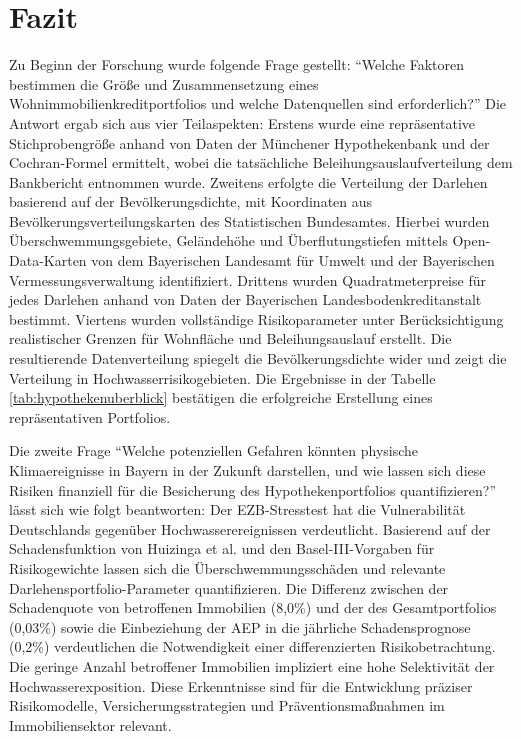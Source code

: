 \section{Fazit}
Zu Beginn der Forschung wurde folgende Frage gestellt: \enquote{Welche Faktoren bestimmen die Größe und Zusammensetzung eines Wohnimmobilienkreditportfolios und welche Datenquellen sind erforderlich?}  Die Antwort ergab sich aus vier Teilaspekten: Erstens wurde eine repräsentative Stichprobengröße anhand von Daten der Münchener Hypothekenbank und der Cochran-Formel ermittelt, wobei die tatsächliche Beleihungsauslaufverteilung dem Bankbericht entnommen wurde. Zweitens erfolgte die Verteilung der Darlehen basierend auf der Bevölkerungsdichte, mit Koordinaten aus Bevölkerungsverteilungskarten des Statistischen Bundesamtes. Hierbei wurden Überschwemmungsgebiete, Geländehöhe und Überflutungstiefen mittels Open-Data-Karten von \textcite{suche_postleitzahl} dem Bayerischen Landesamt für Umwelt und der Bayerischen Vermessungsverwaltung identifiziert. Drittens wurden Quadratmeterpreise für jedes Darlehen anhand von Daten der Bayerischen Landesbodenkreditanstalt bestimmt. Viertens wurden vollständige Risikoparameter unter Berücksichtigung realistischer Grenzen für Wohnfläche und Beleihungsauslauf erstellt. Die resultierende Datenverteilung spiegelt die Bevölkerungsdichte wider und zeigt die Verteilung in Hochwasserrisikogebieten. Die Ergebnisse in der Tabelle \ref{tab:hypothekenuberblick} bestätigen die erfolgreiche Erstellung eines repräsentativen Portfolios.

Die zweite Frage \enquote{Welche potenziellen Gefahren könnten physische Klimaereignisse in Bayern in der Zukunft darstellen, und wie lassen sich diese Risiken finanziell für die Besicherung des Hypothekenportfolios quantifizieren?} lässt sich wie folgt beantworten: Der \ac{EZB}-Stresstest hat die Vulnerabilität Deutschlands gegenüber Hochwasserereignissen verdeutlicht. Basierend auf der Schadensfunktion von Huizinga et al. und den Basel-III-Vorgaben für Risikogewichte lassen sich die Überschwemmungsschäden und relevante Darlehensportfolio-Parameter quantifizieren.  Die Differenz zwischen der Schadenquote von betroffenen Immobilien (8,0\%) und der des Gesamtportfolios (0,03\%) sowie die Einbeziehung der \ac{AEP} in die jährliche Schadensprognose (0,2\%) verdeutlichen die Notwendigkeit einer differenzierten Risikobetrachtung. Die geringe Anzahl betroffener Immobilien impliziert eine hohe Selektivität der Hochwasserexposition. Diese Erkenntnisse sind für die Entwicklung präziser Risikomodelle, Versicherungsstrategien und Präventionsmaßnahmen im Immobiliensektor relevant.

